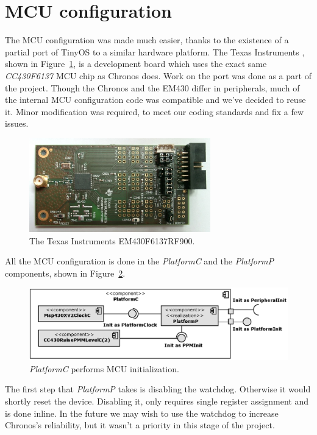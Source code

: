 \section{MCU configuration}

The MCU configuration was made much easier, thanks to the existence of a partial port of TinyOS to a similar hardware platform. The Texas Instruments \cite{EM430}, shown in Figure~\ref{fig:em430_board}, is a development board which uses the exact same \emph{CC430F6137} MCU chip as Chronos does. Work on the port was done as a part of the \cite{OSIAN} project. Though the Chronos and the EM430 differ in peripherals, much of the internal MCU configuration code was compatible and we've decided to reuse it.  Minor modification was required, to meet our coding standards and fix a few issues.
\begin{figure}[h]
  \centering
  \includegraphics[width=0.7\textwidth]{img/em430_board.jpg}
  \caption{The Texas Instruments EM430F6137RF900.}
  \label{fig:em430_board}
\end{figure}

All the MCU configuration is done in the \emph{PlatformC} and the \emph{PlatformP} components, shown in Figure~\ref{fig:platformc}.
\begin{figure}[h]
  \centering
  \includegraphics[width=1.0\textwidth]{diagrams/platformc.eps}
  \caption{\emph{PlatformC} performs MCU initialization.}
  \label{fig:platformc}
\end{figure}
The first step that \emph{PlatformP} takes is disabling the watchdog. Otherwise it would shortly reset the device. Disabling it, only requires single register assignment and is done inline. In the future we may wish to use the watchdog to increase Chronos's reliability, but it wasn't a priority in this stage of the project.

